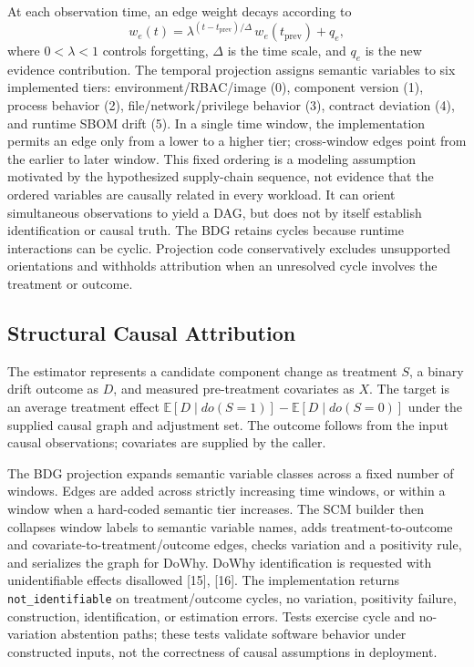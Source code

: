 \documentclass[conference]{IEEEtran}
\begin{document}
At each observation time, an edge weight decays according to
\begin{equation}
w_e(t)=\lambda^{(t-t_{\mathrm{prev}})/\Delta}\,w_e(t_{\mathrm{prev}})+q_e,
\label{eq:weight-decay}
\end{equation}
where $0<\lambda<1$ controls forgetting, $\Delta$ is the time scale, and $q_e$ is the new evidence contribution. The temporal projection assigns semantic variables to six implemented tiers: environment/RBAC/image (0), component version (1), process behavior (2), file/network/privilege behavior (3), contract deviation (4), and runtime SBOM drift (5). In a single time window, the implementation permits an edge only from a lower to a higher tier; cross-window edges point from the earlier to later window. This fixed ordering is a modeling assumption motivated by the hypothesized supply-chain sequence, not evidence that the ordered variables are causally related in every workload. It can orient simultaneous observations to yield a DAG, but does not by itself establish identification or causal truth. The BDG retains cycles because runtime interactions can be cyclic. Projection code conservatively excludes unsupported orientations and withholds attribution when an unresolved cycle involves the treatment or outcome.

\subsection{Structural Causal Attribution}
The estimator represents a candidate component change as treatment $S$, a binary drift outcome as $D$, and measured pre-treatment covariates as $X$. The target is an average treatment effect $\mathbb{E}[D\mid do(S=1)]-\mathbb{E}[D\mid do(S=0)]$ under the supplied causal graph and adjustment set. The outcome follows from the input causal observations; covariates are supplied by the caller.

The BDG projection expands semantic variable classes across a fixed number of windows. Edges are added across strictly increasing time windows, or within a window when a hard-coded semantic tier increases. The SCM builder then collapses window labels to semantic variable names, adds treatment-to-outcome and covariate-to-treatment/outcome edges, checks variation and a positivity rule, and serializes the graph for DoWhy. DoWhy identification is requested with unidentifiable effects disallowed [15], [16]. The implementation returns \texttt{not\_identifiable} on treatment/outcome cycles, no variation, positivity failure, construction, identification, or estimation errors. Tests exercise cycle and no-variation abstention paths; these tests validate software behavior under constructed inputs, not the correctness of causal assumptions in deployment.
\end{document}
